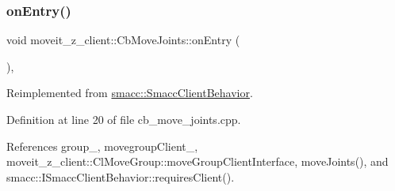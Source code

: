 \subsubsection{\texorpdfstring{on\+Entry()}{onEntry()}}
{\footnotesize\ttfamily void moveit\+\_\+z\+\_\+client\+::\+Cb\+Move\+Joints\+::on\+Entry (\begin{DoxyParamCaption}{ }\end{DoxyParamCaption})\hspace{0.3cm}{\ttfamily [override]}, {\ttfamily [virtual]}}



Reimplemented from \hyperlink{classsmacc_1_1SmaccClientBehavior_ad5d3e1f1697c3cfe66c94cadba948493}{smacc\+::\+Smacc\+Client\+Behavior}.



Definition at line 20 of file cb\+\_\+move\+\_\+joints.\+cpp.



References group\+\_\+, movegroup\+Client\+\_\+, moveit\+\_\+z\+\_\+client\+::\+Cl\+Move\+Group\+::move\+Group\+Client\+Interface, move\+Joints(), and smacc\+::\+I\+Smacc\+Client\+Behavior\+::requires\+Client().


